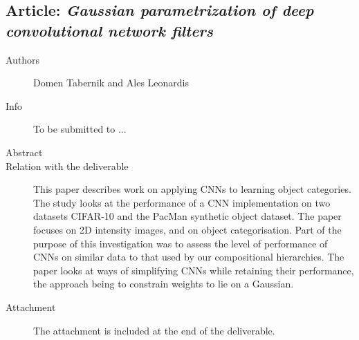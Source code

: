 \documentclass[a4paper,11pt,pdf]{../templates/pacmanreport}
\begin{document}
\subsection{Article: \em Gaussian parametrization of deep convolutional network filters}
\begin{description}
    \item[Authors] Domen Tabernik and Ales Leonardis
    \item[Info] To be submitted to ...%
    \item[Abstract]
    \item [Relation with the deliverable] This paper describes work on applying CNNs to learning object categories. The study looks at the performance of a CNN implementation on two datasets CIFAR-10 and the PacMan synthetic object dataset. The paper focuses on 2D intensity images, and on object categorisation. Part of the purpose of this investigation was to assess the level of performance of CNNs on similar data to that used by our compositional hierarchies. The paper looks at ways of simplifying CNNs while retaining their performance, the approach being to constrain weights to lie on a Gaussian. 
    \item[Attachment] The attachment is included at the end of the deliverable. %
\end{description}
\newpage
\end{document}
